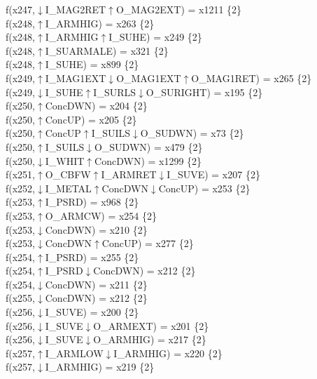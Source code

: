 f(x247,$\downarrow$I\_MAG2RET$\uparrow$O\_MAG2EXT) = x1211 \{2\} \\  
f(x248,$\uparrow$I\_ARMHIG) = x263 \{2\} \\  
f(x248,$\uparrow$I\_ARMHIG$\uparrow$I\_SUHE) = x249 \{2\} \\  
f(x248,$\uparrow$I\_SUARMALE) = x321 \{2\} \\  
f(x248,$\uparrow$I\_SUHE) = x899 \{2\} \\  
f(x249,$\uparrow$I\_MAG1EXT$\downarrow$O\_MAG1EXT$\uparrow$O\_MAG1RET) = x265 \{2\} \\  
f(x249,$\downarrow$I\_SUHE$\uparrow$I\_SURLS$\downarrow$O\_SURIGHT) = x195 \{2\} \\  
f(x250,$\uparrow$ConcDWN) = x204 \{2\} \\  
f(x250,$\uparrow$ConcUP) = x205 \{2\} \\  
f(x250,$\uparrow$ConcUP$\uparrow$I\_SUILS$\downarrow$O\_SUDWN) = x73 \{2\} \\  
f(x250,$\uparrow$I\_SUILS$\downarrow$O\_SUDWN) = x479 \{2\} \\  
f(x250,$\downarrow$I\_WHIT$\uparrow$ConcDWN) = x1299 \{2\} \\  
f(x251,$\uparrow$O\_CBFW$\uparrow$I\_ARMRET$\downarrow$I\_SUVE) = x207 \{2\} \\  
f(x252,$\downarrow$I\_METAL$\uparrow$ConcDWN$\downarrow$ConcUP) = x253 \{2\} \\  
f(x253,$\uparrow$I\_PSRD) = x968 \{2\} \\  
f(x253,$\uparrow$O\_ARMCW) = x254 \{2\} \\  
f(x253,$\downarrow$ConcDWN) = x210 \{2\} \\  
f(x253,$\downarrow$ConcDWN$\uparrow$ConcUP) = x277 \{2\} \\  
f(x254,$\uparrow$I\_PSRD) = x255 \{2\} \\  
f(x254,$\uparrow$I\_PSRD$\downarrow$ConcDWN) = x212 \{2\} \\  
f(x254,$\downarrow$ConcDWN) = x211 \{2\} \\  
f(x255,$\downarrow$ConcDWN) = x212 \{2\} \\  
f(x256,$\downarrow$I\_SUVE) = x200 \{2\} \\  
f(x256,$\downarrow$I\_SUVE$\downarrow$O\_ARMEXT) = x201 \{2\} \\  
f(x256,$\downarrow$I\_SUVE$\downarrow$O\_ARMHIG) = x217 \{2\} \\  
f(x257,$\uparrow$I\_ARMLOW$\downarrow$I\_ARMHIG) = x220 \{2\} \\  
f(x257,$\downarrow$I\_ARMHIG) = x219 \{2\} \\  

